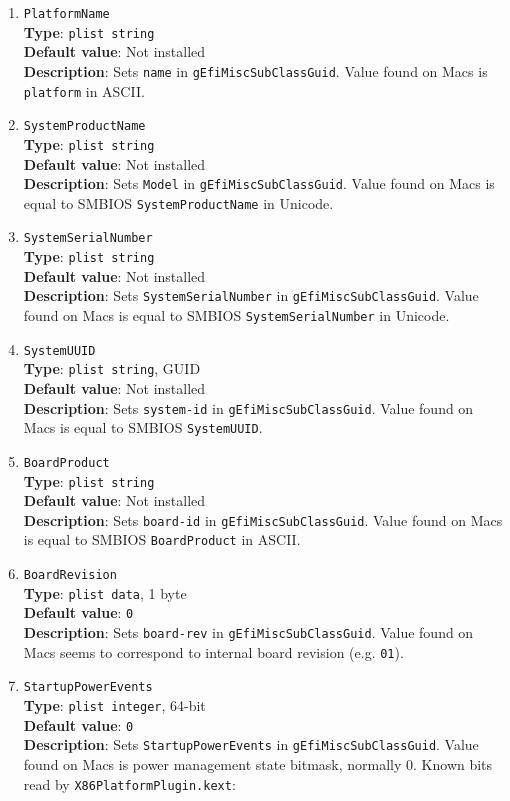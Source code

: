 \documentclass[]{article}
\begin{document}
\begin{enumerate}
\item
  \texttt{PlatformName}\\
  \textbf{Type}: \texttt{plist\ string}\\
  \textbf{Default value}: Not installed\\
  \textbf{Description}: Sets \texttt{name} in
  \texttt{gEfiMiscSubClassGuid}. Value found on Macs is
  \texttt{platform} in ASCII.
\item
  \texttt{SystemProductName}\\
  \textbf{Type}: \texttt{plist\ string}\\
  \textbf{Default value}: Not installed\\
  \textbf{Description}: Sets \texttt{Model} in
  \texttt{gEfiMiscSubClassGuid}. Value found on Macs is equal to SMBIOS
  \texttt{SystemProductName} in Unicode.
\item
  \texttt{SystemSerialNumber}\\
  \textbf{Type}: \texttt{plist\ string}\\
  \textbf{Default value}: Not installed\\
  \textbf{Description}: Sets \texttt{SystemSerialNumber} in
  \texttt{gEfiMiscSubClassGuid}. Value found on Macs is equal to SMBIOS
  \texttt{SystemSerialNumber} in Unicode.
\item
  \texttt{SystemUUID}\\
  \textbf{Type}: \texttt{plist\ string}, GUID\\
  \textbf{Default value}: Not installed\\
  \textbf{Description}: Sets \texttt{system-id} in
  \texttt{gEfiMiscSubClassGuid}. Value found on Macs is equal to SMBIOS
  \texttt{SystemUUID}.
\item
  \texttt{BoardProduct}\\
  \textbf{Type}: \texttt{plist\ string}\\
  \textbf{Default value}: Not installed\\
  \textbf{Description}: Sets \texttt{board-id} in
  \texttt{gEfiMiscSubClassGuid}. Value found on Macs is equal to SMBIOS
  \texttt{BoardProduct} in ASCII.
\item
  \texttt{BoardRevision}\\
  \textbf{Type}: \texttt{plist\ data}, 1 byte\\
  \textbf{Default value}: \texttt{0}\\
  \textbf{Description}: Sets \texttt{board-rev} in
  \texttt{gEfiMiscSubClassGuid}. Value found on Macs seems to correspond
  to internal board revision (e.g. \texttt{01}).
\item
  \texttt{StartupPowerEvents}\\
  \textbf{Type}: \texttt{plist\ integer}, 64-bit\\
  \textbf{Default value}: \texttt{0}\\
  \textbf{Description}: Sets \texttt{StartupPowerEvents} in
  \texttt{gEfiMiscSubClassGuid}. Value found on Macs is power management
  state bitmask, normally 0. Known bits read by
  \texttt{X86PlatformPlugin.kext}:


\end{enumerate}
\end{document}
